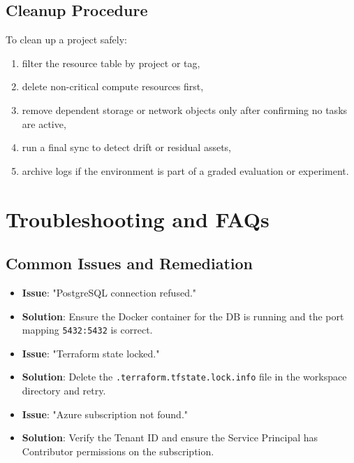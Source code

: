 \subsection{Cleanup Procedure}
To clean up a project safely:
\begin{enumerate}
    \item filter the resource table by project or tag,
    \item delete non-critical compute resources first,
    \item remove dependent storage or network objects only after confirming no tasks are active,
    \item run a final sync to detect drift or residual assets,
    \item archive logs if the environment is part of a graded evaluation or experiment.
\end{enumerate}

\section{Troubleshooting and FAQs}

\subsection{Common Issues and Remediation}
\begin{itemize}
    \item \textbf{Issue}: "PostgreSQL connection refused."
    \item \textbf{Solution}: Ensure the Docker container for the DB is running and the port mapping \texttt{5432:5432} is correct.
    \item \textbf{Issue}: "Terraform state locked."
    \item \textbf{Solution}: Delete the \texttt{.terraform.tfstate.lock.info} file in the workspace directory and retry.
    \item \textbf{Issue}: "Azure subscription not found."
    \item \textbf{Solution}: Verify the Tenant ID and ensure the Service Principal has \\ Contributor permissions on the subscription.
\end{itemize}

